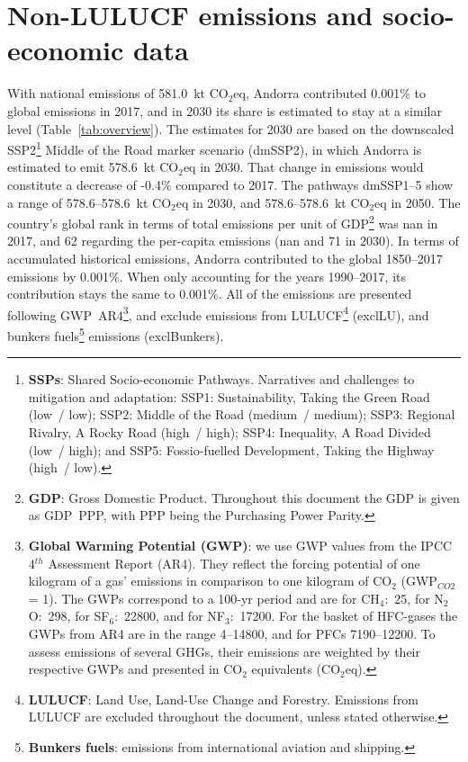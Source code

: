 \documentclass[12pt]{article}
\begin{document}
 \section{Non-LULUCF emissions and socio-economic data}
 \label{sec:nonLULUCFSocioEco}
 With national emissions of 581.0~kt CO$_2$eq, Andorra contributed 0.001\% to global emissions in 2017, and in 2030 its share is estimated to stay at a similar level (Table~\ref{tab:overview}).
 The estimates for 2030 are based on the downscaled SSP2\footnote{\textbf{SSPs}: Shared Socio-economic Pathways.
 Narratives and challenges to mitigation and adaptation: 
 SSP1: Sustainability, Taking the Green Road (low~/ low);
 SSP2: Middle of the Road (medium~/ medium);
 SSP3: Regional Rivalry, A Rocky Road (high~/ high);
 SSP4: Inequality, A Road Divided (low~/ high); and
 SSP5: Fossio-fuelled Development, Taking the Highway (high~/ low).} Middle of the Road marker scenario (dmSSP2), in which Andorra is estimated to emit 578.6~kt CO$_2$eq in 2030.
 That change in emissions would constitute a decrease of -0.4\% compared to 2017. 
 The pathways dmSSP1--5 show a range of 578.6--578.6~kt CO$_2$eq in 2030, and 578.6--578.6~kt CO$_2$eq in 2050.
 The country's global rank in terms of total emissions per unit of GDP\footnote{\textbf{GDP}: Gross Domestic Product. 
 Throughout this document the GDP is given as GDP~PPP, with PPP being the Purchasing Power Parity.} was nan in 2017, and 62 regarding the per-capita emissions (nan and 71 in 2030).
 In terms of accumulated historical emissions, Andorra contributed to the global 1850--2017 emissions by 0.001\%. 
 When only accounting for the years 1990--2017, its contribution stays the same to 0.001\%.
 All of the emissions are presented following GWP~AR4\footnote{\textbf{Global Warming Potential (GWP)}: we use GWP values from the IPCC 4$^{th}$ Assessment Report (AR4). 
 They reflect the forcing potential of one kilogram of a gas' emissions in comparison to one kilogram of CO$_2$ (GWP$_{CO2}$ = 1). 
 The GWPs correspond to a 100-yr period and are for CH$_4$:~25, for N$_2$O:~298, for SF$_6$:~22800, and for NF$_3$:~17200. 
 For the basket of HFC-gases the GWPs from AR4 are in the range 4--14800, and for PFCs 7190--12200. 
 To assess emissions of several GHGs, their emissions are weighted by their respective GWPs and presented in CO$_2$ equivalents (CO$_2$eq).}, and exclude emissions from LULUCF\footnote{\textbf{LULUCF}: Land Use, Land-Use Change and Forestry. 
 Emissions from LULUCF are excluded throughout the document, unless stated otherwise.} (exclLU), and bunkers fuels\footnote{\textbf{Bunkers fuels}: emissions from international aviation and shipping.} emissions (exclBunkers).
\end{document}
